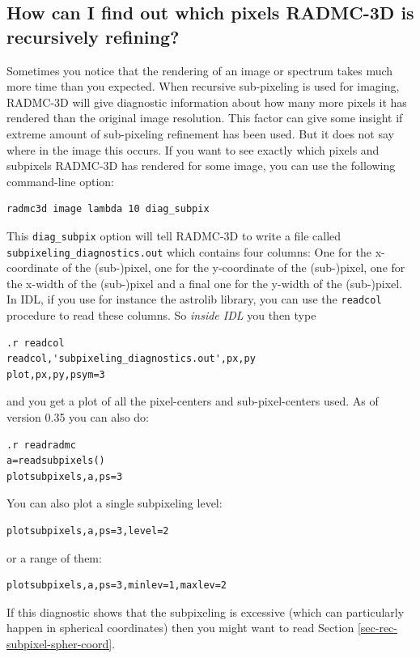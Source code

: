 \documentclass{report}
\begin{document}
\subsection{How can I find out which pixels RADMC-3D is recursively refining?}
Sometimes you notice that the rendering of an image or spectrum takes much
more time than you expected. When recursive sub-pixeling is used for
imaging, RADMC-3D will give diagnostic information about how many more
pixels it has rendered than the original image resolution. This factor
can give some insight if extreme amount of sub-pixeling refinement has
been used. But it does not say where in the image this occurs. If you want
to see exactly which pixels and subpixels RADMC-3D has rendered for some
image, you can use the following command-line option:
{\small\begin{verbatim}
radmc3d image lambda 10 diag_subpix
\end{verbatim}}
This {\small\tt diag\_subpix} option will tell RADMC-3D to write a
file called {\small\tt subpixeling\_diagnostics.out} which contains four
columns: One for the x-coordinate of the (sub-)pixel, one for the 
y-coordinate of the (sub-)pixel, one for the x-width of the (sub-)pixel
and a final one for the y-width of the (sub-)pixel. In IDL, if you use
for instance the astrolib library, you can use the {\small\tt readcol}
procedure to read these columns. So {\em inside IDL} you then type
{\small\begin{verbatim}
.r readcol
readcol,'subpixeling_diagnostics.out',px,py
plot,px,py,psym=3
\end{verbatim}}
and you get a plot of all the pixel-centers and sub-pixel-centers used.
As of version 0.35 you can also do:
{\small\begin{verbatim}
.r readradmc
a=readsubpixels()
plotsubpixels,a,ps=3
\end{verbatim}}
You can also plot a single subpixeling level:
{\small\begin{verbatim}
plotsubpixels,a,ps=3,level=2
\end{verbatim}}
or a range of them:
{\small\begin{verbatim}
plotsubpixels,a,ps=3,minlev=1,maxlev=2
\end{verbatim}}

If this diagnostic shows that the subpixeling is excessive (which can 
particularly happen in spherical coordinates) then you might want to
read Section \ref{sec-rec-subpixel-spher-coord}.
\end{document}
